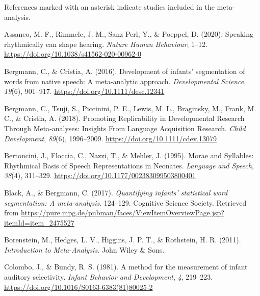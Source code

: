 \documentclass[
  man,mask,floatsintext]{apa6}
\newlength{\cslhangindent}
\newlength{\cslentryspacingunit} %
\newenvironment{CSLReferences}[2] %
 {%
  \setlength{\parindent}{0pt}
  \ifodd #1
  \let\oldpar\par
  \def\par{\hangindent=\cslhangindent\oldpar}
  \fi
  \setlength{\parskip}{#2\cslentryspacingunit}
 }%
 {}
\begin{document}
\begingroup
\setlength{\parindent}{-0.5in}
\setlength{\leftskip}{0.5in}

References marked with an asterisk indicate studies included in the meta-analysis.

\hypertarget{refs}{}
\begin{CSLReferences}{1}{0}
\leavevmode{}%
Assaneo, M. F., Rimmele, J. M., Sanz Perl, Y., \& Poeppel, D. (2020). Speaking rhythmically can shape hearing. \emph{Nature Human Behaviour}, 1--12. \url{https://doi.org/10.1038/s41562-020-00962-0}

\leavevmode{}%
Bergmann, C., \& Cristia, A. (2016). Development of infants' segmentation of words from native speech: A meta-analytic approach. \emph{Developmental Science}, \emph{19}(6), 901--917. \url{https://doi.org/10.1111/desc.12341}

\leavevmode{}%
Bergmann, C., Tsuji, S., Piccinini, P. E., Lewis, M. L., Braginsky, M., Frank, M. C., \& Cristia, A. (2018). Promoting {Replicability} in {Developmental} {Research} {Through} {Meta}-analyses: {Insights} {From} {Language} {Acquisition} {Research}. \emph{Child Development}, \emph{89}(6), 1996--2009. \url{https://doi.org/10.1111/cdev.13079}

\leavevmode{}%
Bertoncini, J., Floccia, C., Nazzi, T., \& Mehler, J. (1995). Morae and {Syllables}: {Rhythmical} {Basis} of {Speech} {Representations} in {Neonates}. \emph{Language and Speech}, \emph{38}(4), 311--329. \url{https://doi.org/10.1177/002383099503800401}

\leavevmode{}%
Black, A., \& Bergmann, C. (2017). \emph{Quantifying infants' statistical word segmentation: {A} meta-analysis}. 124--129. Cognitive Science Society. Retrieved from \url{https://pure.mpg.de/pubman/faces/ViewItemOverviewPage.jsp?itemId=item_2475527}

\leavevmode{}%
Borenstein, M., Hedges, L. V., Higgins, J. P. T., \& Rothstein, H. R. (2011). \emph{Introduction to {Meta}-{Analysis}}. John Wiley \& Sons.

\leavevmode{}%
Colombo, J., \& Bundy, R. S. (1981). A method for the measurement of infant auditory selectivity. \emph{Infant Behavior and Development}, \emph{4}, 219--223. \url{https://doi.org/10.1016/S0163-6383(81)80025-2}


\end{CSLReferences}
\end{document}
